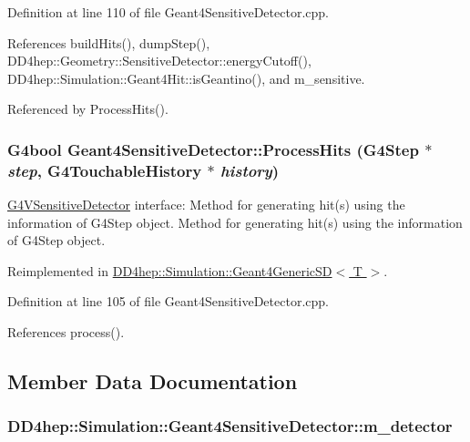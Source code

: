 Definition at line 110 of file Geant4SensitiveDetector.cpp.

References buildHits(), dumpStep(), DD4hep::Geometry::SensitiveDetector::energyCutoff(), DD4hep::Simulation::Geant4Hit::isGeantino(), and m\_\-sensitive.

Referenced by ProcessHits().\hypertarget{class_d_d4hep_1_1_simulation_1_1_geant4_sensitive_detector_ac889694c4406ea089f3172b73da49134}{
\subsubsection[{ProcessHits}]{\setlength{\rightskip}{0pt plus 5cm}G4bool Geant4SensitiveDetector::ProcessHits (G4Step $\ast$ {\em step}, \/  G4TouchableHistory $\ast$ {\em history})}}
\label{class_d_d4hep_1_1_simulation_1_1_geant4_sensitive_detector_ac889694c4406ea089f3172b73da49134}


\hyperlink{class_g4_v_sensitive_detector}{G4VSensitiveDetector} interface: Method for generating hit(s) using the information of G4Step object. Method for generating hit(s) using the information of G4Step object. 

Reimplemented in \hyperlink{class_d_d4hep_1_1_simulation_1_1_geant4_generic_s_d_aecea47598186c697197f51c683f13bbb}{DD4hep::Simulation::Geant4GenericSD$<$ T $>$}.

Definition at line 105 of file Geant4SensitiveDetector.cpp.

References process().

\subsection{Member Data Documentation}
\hypertarget{class_d_d4hep_1_1_simulation_1_1_geant4_sensitive_detector_a0483eb9c4a7e8d31c499239867b53ff1}{
\subsubsection[{m\_\-detector}]{ {\bf DD4hep::Simulation::Geant4SensitiveDetector::m\_\-detector}}}
\label{class_d_d4hep_1_1_simulation_1_1_geant4_sensitive_detector_a0483eb9c4a7e8d31c499239867b53ff1}


